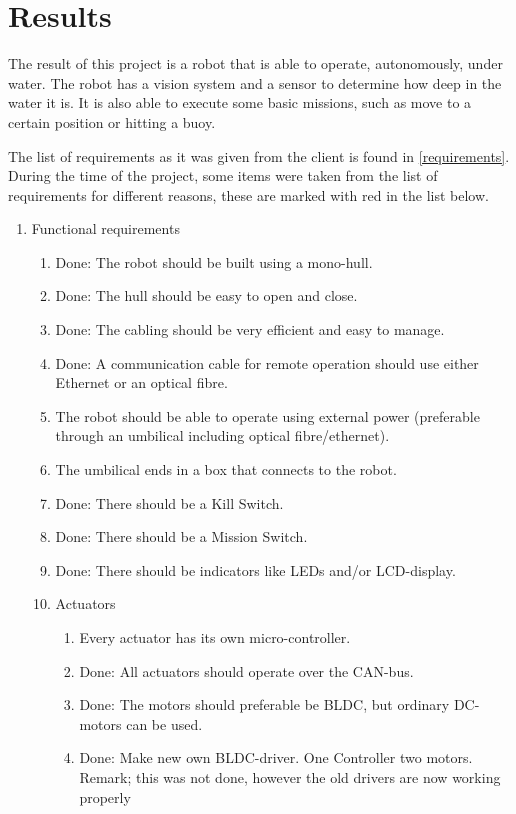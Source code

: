\newpage
\section{Results}
The result of this project is a robot that is able to operate, autonomously, under water. The robot has a vision system and a sensor to determine how deep in the water it is. It is also able to execute some basic missions, such as move to a certain position or hitting a buoy.  

The list of requirements as it was given from the client is found in \ref{requirements}. During the time of the project, some items were taken from the list of requirements for different reasons, these are marked with red in the list below.  

\begin{enumerate}
\label{resultlist}
\item Functional requirements
\begin{enumerate}
\item {\color{green}Done: The robot should be built using a mono-hull.}
\item {\color{green}Done: The hull should be easy to open and close.}
\item {\color{green}Done: The cabling should be very efficient and easy to manage.}
\item {\color{green}Done: A communication cable for remote operation should use either Ethernet or an optical fibre.}
\item The robot should be able to operate using external power (preferable through an umbilical including optical fibre/ethernet).
\item The umbilical ends in a box that connects to the robot. 
\item {\color{green}Done: There should be a Kill Switch.}
\item {\color{green}Done: There should be a Mission Switch.}
\item {\color{green}Done: There should be indicators like LEDs and/or LCD-display.}
\item Actuators
\begin{enumerate}
\item {\color{red} Every actuator has its own micro-controller.}
\item {\color{green}Done: All actuators should operate over the CAN-bus.}
\item {\color{green}Done: The motors should preferable be BLDC, but ordinary DC-motors can be used.}
\item {\color{green}Done: Make new own BLDC-driver. One Controller two motors. Remark; this was not done, however the old drivers are now working properly}

\end{enumerate}
\end{enumerate}
\end{enumerate}

